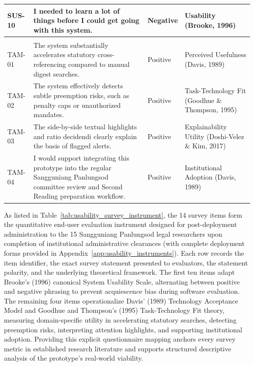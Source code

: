 \begin{table}[!htbp]
\begin{tabularx}{\linewidth}{>{\centering\arraybackslash}p{1.4cm}>{\RaggedRight\arraybackslash}X>{\centering\arraybackslash}p{1.6cm}>{\RaggedRight\arraybackslash}p{3.2cm}}
            SUS-10 & I needed to learn a lot of things before I could get going with this system. & Negative & Usability (Brooke, 1996)~\cite{brooke1996sus} \\
            \midrule
            \multicolumn{4}{l}{\textit{\textbf{Technology Acceptance Model (TAM) \& Task-Technology Fit (TTF)}}} \\
            \midrule
            TAM-01 & The system substantially accelerates statutory cross-referencing compared to manual digest searches. & Positive & Perceived Usefulness (Davis, 1989)~\cite{davis1989perceived} \\
            TAM-02 & The system effectively detects subtle preemption risks, such as penalty caps or unauthorized mandates. & Positive & Task-Technology Fit (Goodhue \& Thompson, 1995)~\cite{goodhue1995task} \\
            TAM-03 & The side-by-side textual highlights and ratio decidendi clearly explain the basis of flagged alerts. & Positive & Explainability Utility (Doshi-Velez \& Kim, 2017)~\cite{doshi2017towards} \\
            TAM-04 & I would support integrating this prototype into the regular Sangguniang Panlungsod committee review and Second Reading preparation workflow. & Positive & Institutional Adoption (Davis, 1989)~\cite{davis1989perceived} \\
            \bottomrule
        \end{tabularx}
    \end{table}

    As listed in Table~\ref{tab:usability_survey_instrument}, the 14 survey items form the quantitative end-user evaluation instrument designed for post-deployment administration to the 15 Sangguniang Panlungsod legal researchers upon completion of institutional administrative clearances (with complete deployment forms provided in Appendix~\ref{app:usability_instruments}). Each row records the item identifier, the exact survey statement presented to evaluators, the statement polarity, and the underlying theoretical framework. The first ten items adapt Brooke's (1996) canonical System Usability Scale, alternating between positive and negative phrasing to prevent acquiescence bias during software evaluation. The remaining four items operationalize Davis' (1989) Technology Acceptance Model and Goodhue and Thompson's (1995) Task-Technology Fit theory, measuring domain-specific utility in accelerating statutory searches, detecting preemption risks, interpreting attention highlights, and supporting institutional adoption. Providing this explicit questionnaire mapping anchors every survey metric in established research literature and supports structured descriptive analysis of the prototype's real-world viability.

